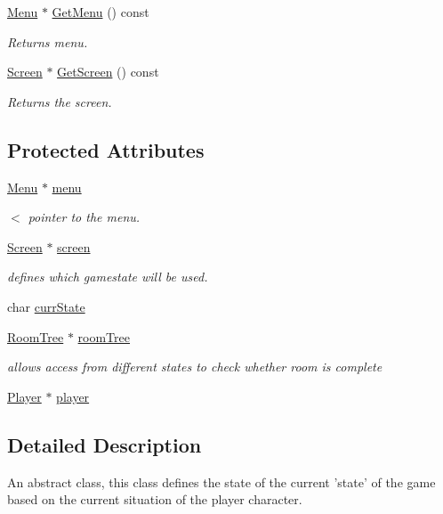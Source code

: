 \begin{DoxyCompactItemize}
\hyperlink{classMenu}{Menu} $\ast$ \hyperlink{classGameState_a55916672a315f362be7e17824fdaf3b4}{Get\-Menu} () const 
\begin{DoxyCompactList}\small\item\em Returns menu. \end{DoxyCompactList}\item 
\hyperlink{classScreen}{Screen} $\ast$ \hyperlink{classGameState_a275d26b431969575e7bd0de96be2d6b2}{Get\-Screen} () const 
\begin{DoxyCompactList}\small\item\em Returns the screen. \end{DoxyCompactList}\end{DoxyCompactItemize}
\subsection*{Protected Attributes}
\begin{DoxyCompactItemize}
\item 
\hyperlink{classMenu}{Menu} $\ast$ \hyperlink{classGameState_aebc12d6e90edfbe51a571858f6288f93}{menu}
\begin{DoxyCompactList}\small\item\em $<$ pointer to the menu. \end{DoxyCompactList}\item 
\hyperlink{classScreen}{Screen} $\ast$ \hyperlink{classGameState_a877c0c626d54802e54e876a56dc6603b}{screen}
\begin{DoxyCompactList}\small\item\em defines which gamestate will be used. \end{DoxyCompactList}\item 
char \hyperlink{classGameState_a541915faaaac7068797345cce53deb9c}{curr\-State}
\item 
\hyperlink{classRoomTree}{Room\-Tree} $\ast$ \hyperlink{classGameState_acf694139ba8388f8258eeffdb75f0c3b}{room\-Tree}
\begin{DoxyCompactList}\small\item\em allows access from different states to check whether room is complete \end{DoxyCompactList}\item 
\hyperlink{classPlayer}{Player} $\ast$ \hyperlink{classGameState_a580b319e1866f1bb79328c7d09581bdf}{player}
\end{DoxyCompactItemize}


\subsection{Detailed Description}
An abstract class, this class defines the state of the current 'state' of the game based on the current situation of the player character. 

